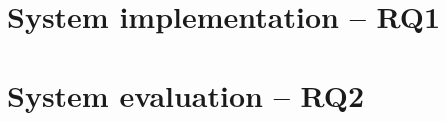 %

\section{System implementation -- RQ1}
  

\section{System evaluation -- RQ2}
  \label{sec:sys_eval}
  